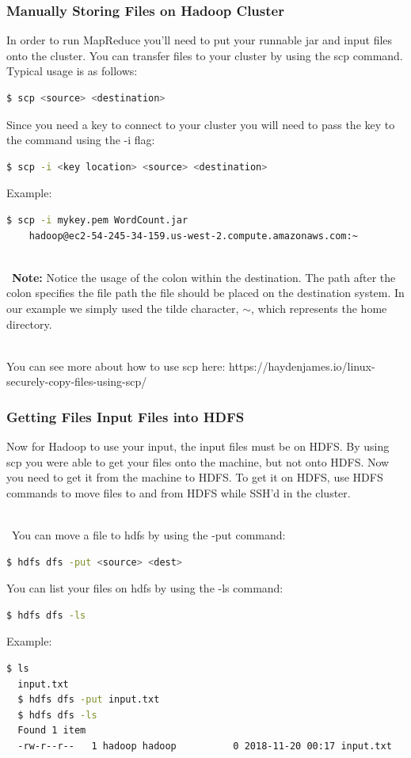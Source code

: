 \documentclass{article}
\begin{document}
\subsubsection{Manually Storing Files on Hadoop Cluster}
In order to run MapReduce you'll need to put your runnable jar and input files onto the cluster. You can transfer files to your cluster by using the scp command. Typical usage is as follows:
\begin{lstlisting}[language=bash]
  $ scp <source> <destination>
\end{lstlisting} 
Since you need a key to connect to your cluster you will need to pass the key to the command using the -i flag:
\begin{lstlisting}[language=bash]
  $ scp -i <key location> <source> <destination>
\end{lstlisting}
Example:
\begin{lstlisting}[language=bash]
  $ scp -i mykey.pem WordCount.jar 
    hadoop@ec2-54-245-34-159.us-west-2.compute.amazonaws.com:~
\end{lstlisting}
\-\\\ \textbf{Note:} Notice the usage of the colon within the destination. The path after the colon specifies the file path the file should be placed on the destination system. In our example we simply used the tilde character, $\sim$, which represents the home directory.

\-\ \\ You can see more about how to use scp here: https://haydenjames.io/linux-securely-copy-files-using-scp/

\subsubsection{Getting Files Input Files into HDFS}
Now for Hadoop to use your input, the input files must be on HDFS. By using scp you were able to get your files onto the machine, but not onto HDFS. Now you need to get it from the machine to HDFS. To get it on HDFS, use HDFS commands to move files to and from HDFS while SSH'd in the cluster.

\-\\\ You can move a file to hdfs by using the -put command:
\begin{lstlisting}[language=bash]
  $ hdfs dfs -put <source> <dest>
\end{lstlisting}    
You can list your files on hdfs by using the -ls command:
\begin{lstlisting}[language=bash]
  $ hdfs dfs -ls 
\end{lstlisting} 
Example:
\begin{lstlisting}[language=bash]
  $ ls
  input.txt
  $ hdfs dfs -put input.txt 
  $ hdfs dfs -ls 
  Found 1 item 
  -rw-r--r--   1 hadoop hadoop          0 2018-11-20 00:17 input.txt
\end{lstlisting} 
\end{document}
